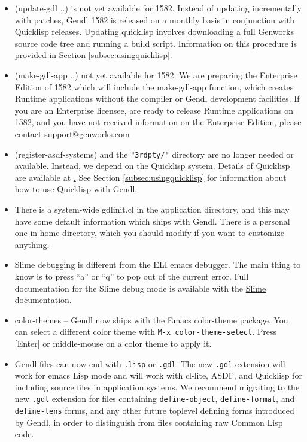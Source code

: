 \documentclass [11pt]{book}
\begin{document}
\begin{itemize}

\item (update-gdl ..) is not yet available for 1582. Instead
of updating incrementally with patches, Gendl 1582 is released on a
monthly basis in conjunction with Quicklisp releases.  Updating
quicklisp involves downloading a full Genworks source code tree and
running a build script. Information on this procedure is provided in
Section 
\ref{subsec:usingquicklisp}.

\item (make-gdl-app ..) not yet available for 1582. We are
preparing the Enterprise Edition of 1582 which will include the
make-gdl-app function, which creates Runtime applications without the
compiler or Gendl development facilities.  If you are an Enterprise
licensee, are ready to release Runtime applications on 1582, and you
have not received information on the Enterprise Edition, please
contact support@genworks.com

\item (register-asdf-systems) and the \texttt{"3rdpty/"} directory are no longer needed or available. Instead, we depend on the Quicklisp
system. Details of Quicklisp are available at \href{http://www.quicklisp.org}. See Section 
\ref{subsec:usingquicklisp} for information about how to use Quicklisp with Gendl.

\item There is a system-wide gdlinit.cl in the application
       directory, and this may have some default information which
       ships with Gendl. There is a personal one in home directory,
       which you should modify if you want to customize anything.

\item Slime debugging is different from the ELI emacs debugger. The main thing to know is 
to press ``a'' or ``q'' to pop out of the current error. Full documentation for the Slime debug mode
is available with the \href{http://common-lisp.net/project/slime/doc/html/Debugger.html}{Slime documentation}.

\item color-themes -- Gendl now ships with the Emacs
       color-theme package. You can select a different color theme with \texttt{M-x color-theme-select}. Press [Enter] or middle-mouse on a color theme to apply it.

\item Gendl files can now end with \texttt{.lisp} or \texttt{.gdl}. The new \texttt{.gdl} extension will work for emacs Lisp mode and will work with
	 cl-lite, ASDF, and Quicklisp for including source files in application systems. We recommend migrating
to the new \texttt{.gdl} extension for files containing \texttt{define-object}, \texttt{define-format}, and \texttt{define-lens} forms, and any other future toplevel defining forms introduced by Gendl, in order to distinguish 
from files containing raw Common Lisp code.


\end{itemize}
\end{document}

